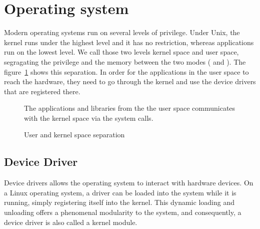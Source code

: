\section{Operating system}



Modern operating systems run on several levels of privilege.
Under Unix, the kernel runs under the highest level and it has no restriction, whereas applications run on the lowest level.
We call those two levels kernel space and user space, segragating the privilege and the memory between the two modes (\citet{tanenbaum2014} and \citet[chap. 2]{Corbet:2005:LDD:1209083}).
The figure~\ref{fig:user-kernel} shows this separation.
In order for the applications in the user space to reach the hardware, they need to go through the kernel and use the device drivers that are registered there.

\begin{figure}[ht]
\center

\caption{User and kernel space separation}{The applications and libraries from the the user space communicates with the kernel space via the system calls.}
\label{fig:user-kernel}
\end{figure}

\subsection{Device Driver}\label{sec:theory-driver}
Device drivers allows the operating system to interact with hardware devices.
On a Linux operating system, a driver can be loaded into the system while it is running, simply registering itself into the kernel.
This dynamic loading and unloading offers a phenomenal modularity to the system, and consequently, a device driver is also called a kernel module.\newline{}

